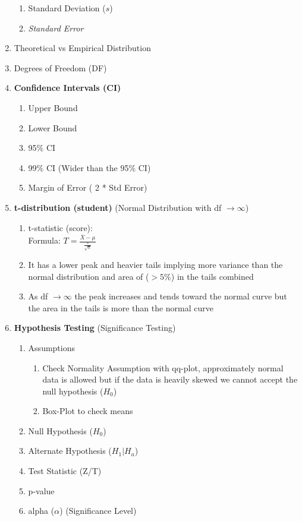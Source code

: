 \documentclass[11pt]{article}
\begin{document}
\begin{enumerate}
\begin{enumerate}
	\item Standard Deviation ($s$)
	\item \textit{Standard Error}
\end{enumerate}
\item Theoretical vs Empirical Distribution
\item Degrees of Freedom (DF)
\item \textbf{Confidence Intervals (CI)}
\begin{enumerate}
	\item Upper Bound
	\item Lower Bound
	\item 95\% CI
	\item 99\% CI (Wider than the 95\% CI)
	\item Margin of Error ( 2 * Std Error)
\end{enumerate}
\item \textbf{t-distribution (student)} (Normal Distribution with df $ \to \infty$)
\begin{enumerate}
	\item t-statistic (score):\\
	Formula: 
	$T = \frac{ \bar{X} - \mu}{ \frac{s}{\sqrt{n}} }$
	\item It has a lower peak and heavier tails implying more variance than the normal distribution and area of ($> 5\%$) in the tails combined
	\item As df $\to \infty$ the peak increases and tends toward the normal curve but the area in the tails is more than the normal curve
\end{enumerate}
\item \textbf{Hypothesis Testing} (Significance Testing)
\begin{enumerate}
	\item Assumptions
	\begin{enumerate}
		\item Check Normality Assumption with qq-plot, approximately normal data is allowed but if the data is heavily skewed we cannot accept the null hypothesis ($H_0$)
		\item Box-Plot to check means
	\end{enumerate}
	\item Null Hypothesis ($H_0$) 
	\item Alternate Hypothesis ($H_1 | H_a$)
	\item Test Statistic (Z/T)
	\item p-value 
	\item alpha ($\alpha$) (Significance Level)

\end{enumerate}
\end{enumerate}
\end{document}
